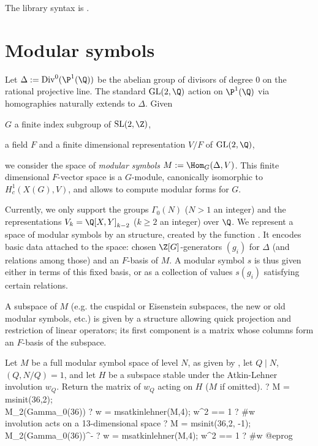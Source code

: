 The library syntax is .

%
%

\section{Modular symbols}

Let $\Delta := \text{Div}^0(\P^1(\Q))$ be the abelian group of divisors of
degree $0$ on the rational projective line. The standard $\text{GL}(2,\Q)$
action on $\P^1(\Q)$ via homographies naturally extends to $\Delta$. Given

\item $G$ a finite index subgroup of $\text{SL}(2,\Z)$,

\item a field $F$ and a finite dimensional representation $V/F$ of
  $\text{GL}(2,\Q)$,

\noindent we consider the space of \emph{modular symbols} $M :=
\Hom_G(\Delta, V)$. This finite dimensional $F$-vector
space is a $G$-module, canonically isomorphic to $H^1_c(X(G), V)$,
and allows to compute modular forms for $G$.

Currently, we only support the groups $\Gamma_0(N)$ ($N > 1$ an integer)
and the representations $V_k = \Q[X,Y]_{k-2}$ ($k \geq 2$ an integer) over
$\Q$. We represent a space of modular symbols by an  structure,
created by the function . It encodes basic data attached to the
space: chosen $\Z[G]$-generators $(g_i)$ for $\Delta$ (and relations among
those) and an $F$-basis of $M$. A modular symbol $s$ is thus given either in
terms of this fixed basis, or as a collection of values $s(g_i)$
satisfying certain relations.

A subspace of $M$ (e.g. the cuspidal or Eisenstein subspaces, the new or
old modular symbols, etc.) is given by a structure allowing quick projection
and restriction of linear operators; its first component is a matrix whose
columns  form  an $F$-basis  of the subspace.


\label{se:msatkinlehner}
Let $M$ be a full modular symbol space of level $N$,
as given by , let $Q \mid N$, $(Q,N/Q) = 1$,
and let $H$ be a subspace stable under the Atkin-Lehner involution $w_Q$.
Return the matrix of $w_Q$ acting on $H$ ($M$ if omitted).
\bprog
? M = msinit(36,2); \\ M_2(Gamma_0(36))
? w = msatkinlehner(M,4); w^2 == 1
? #w   \\ involution acts on a 13-dimensional space
? M = msinit(36,2, -1); \\ M_2(Gamma_0(36))^-
? w = msatkinlehner(M,4); w^2 == 1
? #w
@eprog

